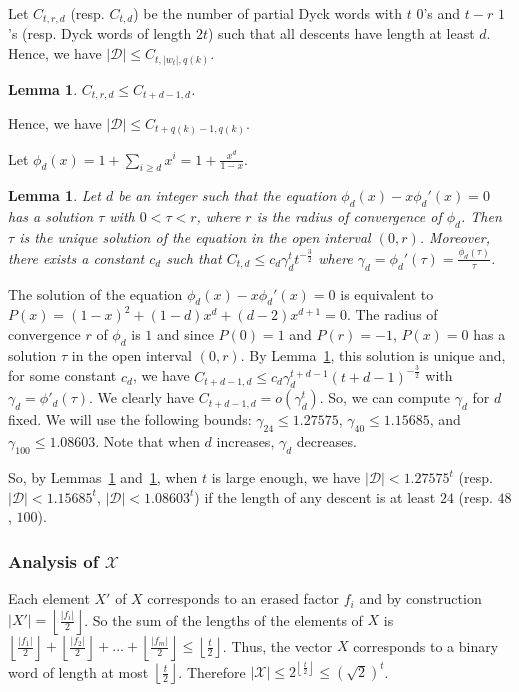 \documentclass[]{elsart}
\def\floor#1{\left\lfloor #1 \right\rfloor}
\newtheorem{lemma}[theorem]{Lemma}
\begin{document}
Let $C_{t,r,d}$ (resp. $C_{t,d}$) be the number of partial Dyck words
with $t$ $0$'s and $t-r$ $1$'s (resp. Dyck words of length $2t$) such
that all descents have length at least $d$. Hence, we have $|\mathcal{D}|
\le C_{t,|w_t|,q(k)}$.

\begin{lemma}\cite{Esperet:2012}\label{louis1}
  $C_{t,r,d}\le C_{t+d-1,d}$.
\end{lemma}

Hence, we have  $|\mathcal{D}|\le C_{t+q(k)-1,q(k)}$.

Let $\phi_d(x) = 1+\sum_{i\ge d}x^i = 1+\frac{x^d}{1-x}$.

\begin{lemma}\cite{Esperet:2012}\label{louis2}
  Let $d$ be an integer such that the equation $\phi_d(x)-x\phi_d'(x)=0$
  has a solution $\tau$ with $0<\tau<r$, where $r$ is the radius of
  convergence of $\phi_d$. Then $\tau$ is the unique solution of the
  equation in the open interval $(0,r)$. Moreover, there exists a
  constant $c_d$ such that $C_{t,d}\le c_d\gamma_d^tt^{-\frac{3}{2}}$
  where $\gamma_d=\phi_d'(\tau)=\frac{\phi_d(\tau)}{\tau}$.
\end{lemma}

The solution of the equation $\phi_{d}(x)-x\phi_{d}'(x)=0$
is equivalent to $P(x)=(1-x)^2+(1-d)x^{d}+(d-2)x^{d+1}=0$.
The radius of convergence $r$ of $\phi_{d}$ is $1$ and since
$P(0)=1$ and $P(r)=-1$, $P(x)=0$ has a solution $\tau$ in the open
interval $(0,r)$. By Lemma~\ref{louis2}, this solution is unique and,
for some constant $c_{d}$, we have $C_{t+d-1,d}\le
c_{d}\gamma_d^{t+d-1}({t+d-1})^{-\frac{3}{2}}$ with
$\gamma_d=\phi'_{d}(\tau)$. We clearly have $C_{t+d-1,d}=o(\gamma_d^t)$.
So, we can compute $\gamma_d$ for $d$ fixed. We will use the following bounds:
$\gamma_{24}\le 1.27575$, $\gamma_{40}\le 1.15685$, and $\gamma_{100}\le 1.08603$.
Note that when $d$ increases, $\gamma_d$ decreases. 

So, by Lemmas~\ref{louis1} and~\ref{louis2}, when $t$ is large enough,
we have $|\mathcal{D}| < 1.27575^t$ (resp. $|\mathcal{D}| <
1.15685^t$, $|\mathcal{D}| < 1.08603^t$) if the length of any descent
is at least $24$ (resp. $48$, $100$).

\subsubsection{Analysis of $\mathcal{X}$}

Each element $X'$ of $X$ corresponds to an erased factor $f_i$ and by
construction $|X'| = \floor{\frac{|f_i|}{2}}$. So the sum of the
lengths of the elements of $X$ is $\floor{\frac{|f_1|}{2}} +
\floor{\frac{|f_2|}{2}} + \ldots + \floor{\frac{|f_m|}{2}}\le
\floor{\frac{t}{2}}$. Thus, the vector $X$ corresponds to a binary
word of length at most $\floor{\frac{t}{2}}$. Therefore
$|\mathcal{X}|\le 2^{\floor{\frac{t}{2}}}\le (\sqrt{2})^t$.
\end{document}
